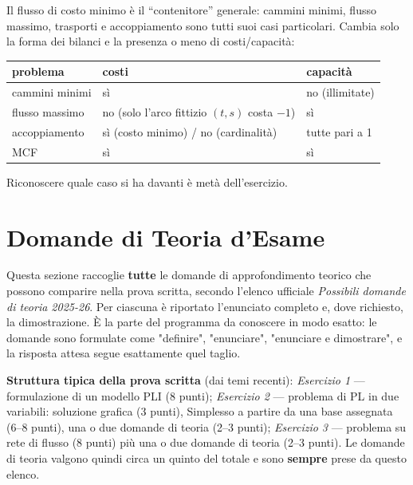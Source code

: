 \documentclass[12pt]{extarticle} %
\begin{document}
\begin{tcolorbox}[colback=blue!4, colframe=blue!50!black, title=\textbf{Morale della sezione}]
Il flusso di costo minimo è il ``contenitore'' generale: cammini minimi, flusso massimo, trasporti e accoppiamento sono tutti suoi casi particolari. Cambia solo la forma dei bilanci e la presenza o meno di costi/capacità:
\begin{center}
\begin{tabular}{lll}
\hline
\textbf{problema} & \textbf{costi} & \textbf{capacità} \\
\hline
cammini minimi & sì & no (illimitate) \\
flusso massimo & no (solo l'arco fittizio $(t,s)$ costa $-1$) & sì \\
accoppiamento & sì (costo minimo) / no (cardinalità) & tutte pari a 1 \\
MCF & sì & sì \\
\hline
\end{tabular}
\end{center}
Riconoscere quale caso si ha davanti è metà dell'esercizio.
\end{tcolorbox}

\newpage

\section{Domande di Teoria d'Esame}

\begin{tcolorbox}[colback=red!5, colframe=red!60!black, title=\textbf{Da leggere prima dell'esame}]
Questa sezione raccoglie \textbf{tutte} le domande di approfondimento teorico che possono comparire nella prova scritta, secondo l'elenco ufficiale \textit{Possibili domande di teoria 2025-26}. Per ciascuna è riportato l'enunciato completo e, dove richiesto, la dimostrazione. È la parte del programma da conoscere in modo esatto: le domande sono formulate come "definire", "enunciare", "enunciare e dimostrare", e la risposta attesa segue esattamente quel taglio.

\medskip
\noindent\textbf{Struttura tipica della prova scritta} (dai temi recenti): \textit{Esercizio 1} --- formulazione di un modello PLI (8 punti); \textit{Esercizio 2} --- problema di PL in due variabili: soluzione grafica (3 punti), Simplesso a partire da una base assegnata (6--8 punti), una o due domande di teoria (2--3 punti); \textit{Esercizio 3} --- problema su rete di flusso (8 punti) più una o due domande di teoria (2--3 punti). Le domande di teoria valgono quindi circa un quinto del totale e sono \textbf{sempre} prese da questo elenco.
\end{tcolorbox}
\end{document}
